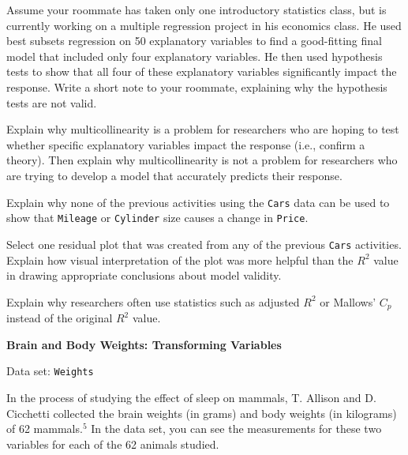 \documentclass[
]{report}
\begin{document}
\begin{list}{E..}{ \setlength{\itemsep}{1.2em}}
  \item Assume your roommate has taken only one introductory statistics class, but is currently working on a multiple regression project in his economics class. He used best subsets regression on 50 explanatory variables to find a good-fitting final model that included only four explanatory variables. He then used hypothesis tests to show that all four of these explanatory variables significantly impact the response. Write a short note to your roommate, explaining why the hypothesis tests are not valid.

  \item Explain why multicollinearity is a problem for researchers who are hoping to test whether specific explanatory variables impact the response (i.e., confirm a theory). Then explain why multicollinearity is not a problem for researchers who are trying to develop a model that accurately predicts their response.

  \item Explain why none of the previous activities using the \texttt{Cars} data can be used to show that \texttt{Mileage} or \texttt{Cylinder} size causes a change in \texttt{Price}.

  \item Select one residual plot that was created from any of the previous \texttt{Cars} activities. Explain how visual interpretation of the plot was more helpful than the $R^2$ value in drawing appropriate conclusions about model validity.

  \item Explain why researchers often use statistics such as adjusted $R^2$ or Mallows’ $C_p$ instead of the original $R^2$ value.

  \item \textbf{Brain and Body Weights: Transforming Variables}

Data set: \texttt{Weights}

In the process of studying the effect of sleep on mammals, T. Allison and D. Cicchetti collected the brain weights (in grams) and body weights (in kilograms) of 62 mammals.$^5$ In the data set, you can see the measurements for these two variables for each of the 62 animals studied.


\end{list}
\end{document}
